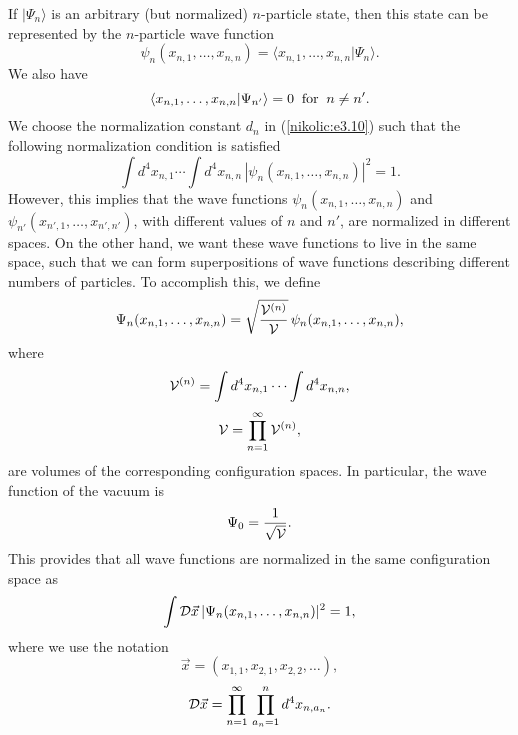 \documentclass[12pt,twoside]{report} %
\begin{document}
If $|\Psi_n\rangle$ is an arbitrary (but normalized) $n$-particle state,
then this state can be represented by the $n$-particle wave function
\begin{equation}\label{nikolic:e3.12}
 \psi_n(x_{n,1}, \ldots , x_{n,n}) = \langle x_{n,1}, \ldots , x_{n,n} |\Psi_n\rangle .
\end{equation}
We also have
\begin{equation}\label{nikolic:e3.12.1}
 \langle x_{n,1}, \ldots , x_{n,n} |\Psi_{n'}\rangle =0 \;\;{\rm for}\;\; n\neq n' .
\end{equation}
We choose the normalization constant $d_n$ in (\ref{nikolic:e3.10}) such that the following
normalization condition is satisfied
\begin{equation}\label{nikolic:e3.13}
 \int d^4x_{n,1}\cdots \int d^4x_{n,n} \, | \psi_n(x_{n,1}, \ldots , x_{n,n})|^2 =1 .
\end{equation}
However, this implies that the wave functions 
$\psi_n(x_{n,1}, \ldots , x_{n,n})$ and $\psi_{n'}(x_{n',1}, \ldots , x_{n',n'})$,
with different values of $n$ and $n'$,
are normalized in different spaces. On the other hand, we want these wave functions
to live in the same space, such that we can form superpositions of wave functions
describing different numbers of particles. To accomplish this, we define
\begin{equation}\label{nikolic:e3.14}
\Psi_n(x_{n,1}, \ldots , x_{n,n})=\sqrt{ \frac{{\cal V}^{(n)}}{{\cal V}} } \,
\psi_n(x_{n,1}, \ldots , x_{n,n}) ,
\end{equation}
where
\begin{equation}\label{nikolic:e3.15}
 {\cal V}^{(n)}=\int d^4x_{n,1}\cdots \int d^4x_{n,n} ,
\end{equation}
\begin{equation}\label{nikolic:e3.16}
 {\cal V}=\prod_{n=1}^{\infty} {\cal V}^{(n)} ,
\end{equation}
are volumes of the corresponding configuration spaces.
In particular, the wave function of the vacuum is
\begin{equation}\label{nikolic:e3.17}
\Psi_0=\frac{1}{\sqrt{{\cal V}}} .
\end{equation}
This provides that all wave functions are normalized in the same configuration space
as
 \begin{equation}\label{nikolic:e3.18}
\int {\cal D}\vec{x} \, | \Psi_n(x_{n,1}, \ldots , x_{n,n})|^2 =1 ,
\end{equation}
where we use the notation
\begin{equation}\label{nikolic:e3.19}
 \vec{x}=(x_{1,1},x_{2,1},x_{2,2},\ldots ),
\end{equation}
\begin{equation}\label{nikolic:e3.20}
 {\cal D}\vec{x} = \prod_{n=1}^{\infty} \, \prod_{a_{n}=1}^{n} d^4x_{n,a_{n}} .
\end{equation}
\end{document}
